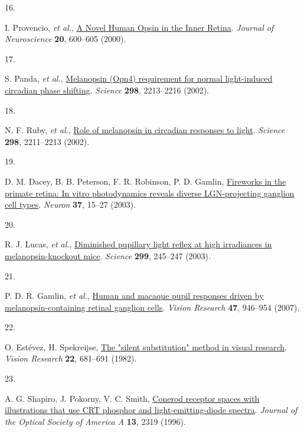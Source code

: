 \documentclass[
]{article}
\newlength{\cslhangindent}
\newlength{\csllabelwidth}
\newlength{\cslentryspacingunit} %
\newenvironment{CSLReferences}[2] %
 {%
  \setlength{\parindent}{0pt}
  \ifodd #1
  \let\oldpar\par
  \def\par{\hangindent=\cslhangindent\oldpar}
  \fi
  \setlength{\parskip}{#2\cslentryspacingunit}
 }%
 {}
\newcommand{\CSLLeftMargin}[1]{\parbox[t]{\csllabelwidth}{#1}}
\newcommand{\CSLRightInline}[1]{\parbox[t]{\linewidth - \csllabelwidth}{#1}\break}
\begin{document}
\begin{CSLReferences}{0}{0}
\leavevmode{}%
\CSLLeftMargin{16. }%
\CSLRightInline{I. Provencio, \emph{et al.}, \href{https://doi.org/10.1523/JNEUROSCI.20-02-00600.2000}{A {Novel} {Human} {Opsin} in the {Inner} {Retina}}. \emph{Journal of Neuroscience} \textbf{20}, 600--605 (2000).}

\leavevmode{}%
\CSLLeftMargin{17. }%
\CSLRightInline{S. Panda, \emph{et al.}, \href{https://doi.org/10.1126/science.1076848}{Melanopsin (Opn4) requirement for normal light-induced circadian phase shifting}. \emph{Science} \textbf{298}, 2213--2216 (2002).}

\leavevmode{}%
\CSLLeftMargin{18. }%
\CSLRightInline{N. F. Ruby, \emph{et al.}, \href{https://doi.org/10.1126/science.1076701}{Role of melanopsin in circadian responses to light}. \emph{Science} \textbf{298}, 2211--2213 (2002).}

\leavevmode{}%
\CSLLeftMargin{19. }%
\CSLRightInline{D. M. Dacey, B. B. Peterson, F. R. Robinson, P. D. Gamlin, \href{https://doi.org/10.1016/S0896-6273(02)01143-1}{Fireworks in the primate retina: In vitro photodynamics reveals diverse LGN-projecting ganglion cell types}. \emph{Neuron} \textbf{37}, 15--27 (2003).}

\leavevmode{}%
\CSLLeftMargin{20. }%
\CSLRightInline{R. J. Lucas, \emph{et al.}, \href{https://doi.org/10.1126/science.1077293}{Diminished pupillary light reflex at high irradiances in melanopsin-knockout mice}. \emph{Science} \textbf{299}, 245--247 (2003).}

\leavevmode{}%
\CSLLeftMargin{21. }%
\CSLRightInline{P. D. R. Gamlin, \emph{et al.}, \href{https://doi.org/10.1016/j.visres.2006.12.015}{Human and macaque pupil responses driven by melanopsin-containing retinal ganglion cells}. \emph{Vision Research} \textbf{47}, 946--954 (2007).}

\leavevmode{}%
\CSLLeftMargin{22. }%
\CSLRightInline{O. Estévez, H. Spekreijse, \href{https://doi.org/10.1016/0042-6989(82)90104-3}{The "silent substitution" method in visual research}. \emph{Vision Research} \textbf{22}, 681--691 (1982).}

\leavevmode{}%
\CSLLeftMargin{23. }%
\CSLRightInline{A. G. Shapiro, J. Pokorny, V. C. Smith, \href{https://doi.org/10.1364/josaa.13.002319}{Cone{\textendash}rod receptor spaces with illustrations that use {CRT} phosphor and light-emitting-diode spectra}. \emph{Journal of the Optical Society of America A} \textbf{13}, 2319 (1996).}


\end{CSLReferences}
\end{document}
